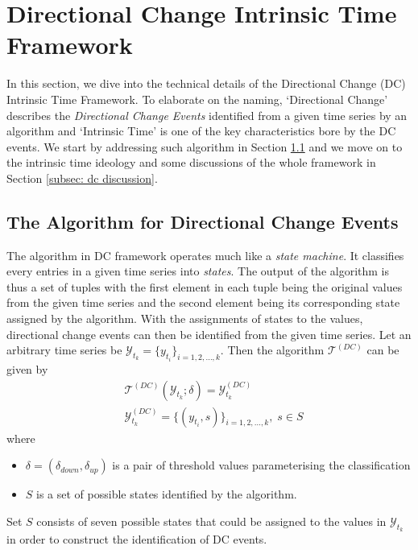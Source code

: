 \section{Directional Change Intrinsic Time Framework}

In this section, we dive into the technical details of the Directional Change (DC) Intrinsic Time Framework. To elaborate on the naming, `Directional Change' describes the \textit{Directional Change Events} identified from a given time series by an algorithm and `Intrinsic Time' is one of the key characteristics bore by the DC events. We start by addressing such algorithm in Section \ref{subsec: dc algo} and we move on to the intrinsic time ideology and some discussions of the whole framework in Section \ref{subsec: dc discussion}.

\subsection{The Algorithm for Directional Change Events}\label{subsec: dc algo}
The algorithm in DC framework operates much like a \textit{state machine}. It classifies every entries in a given time series into \textit{states}. The output of the algorithm is thus a set of tuples with the first element in each tuple being the original values from the given time series and the second element being its corresponding state assigned by the algorithm. With the assignments of states to the values, directional change events can then be identified from the given time series. Let an arbitrary time series be $\mathcal{Y}_{t_k} = \{y_{t_i} \}_{i = 1, 2, \ldots, k}$. Then the algorithm $\mathcal{T}^{(DC)}$ can be given by
\begin{align*}
    &\mathcal{T}^{(DC)} (\mathcal{Y}_{t_k} ; \delta) = \mathcal{Y}_{t_k}^{(DC)} \\
    &\mathcal{Y}_{t_k}^{(DC)} = \{ (y_{t_i}, s)\}_{i = 1, 2, \ldots, k}, \; s \in S
\end{align*}
where
\begin{itemize}
    \setlength\itemsep{-5pt}
    \item $\delta = (\delta_{down}, \delta_{up})$ is a pair of threshold values parameterising the classification
    \item $S$ is a set of possible states identified by the algorithm.
\end{itemize}
Set $S$ consists of seven possible states that could be assigned to the values in $\mathcal{Y}_{t_k}$ in order to construct the identification of DC events.
